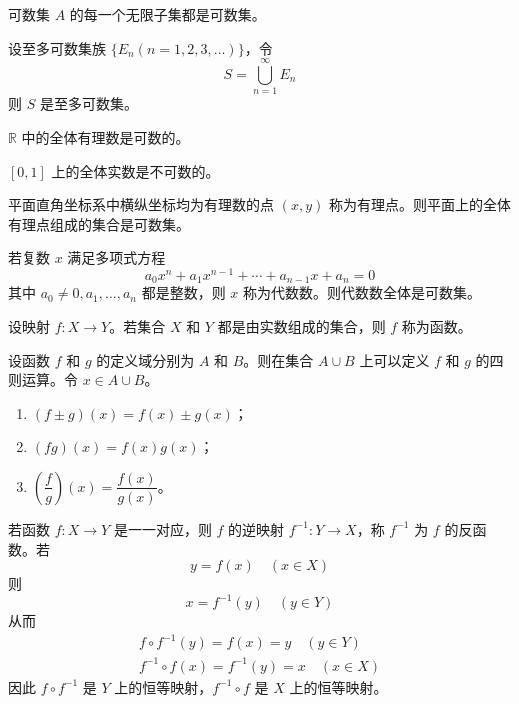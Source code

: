 \begin{theorem}
    可数集 $A$ 的每一个无限子集都是可数集。
\end{theorem}

\begin{theorem}
    设至多可数集族 $\{ E_n (n = 1,2,3, \ldots) \}$，令
    \[S = \bigcup_{n = 1}^{\infty} E_n \]
    则 $S$ 是至多可数集。
\end{theorem}

\begin{theorem}
    $\mathbb{R}$ 中的全体有理数是可数的。
\end{theorem}

\begin{theorem}
    $[0, 1]$ 上的全体实数是不可数的。
\end{theorem}

\begin{proposition}
    平面直角坐标系中横纵坐标均为有理数的点 $(x, y)$ 称为有理点。则平面上的全体有理点组成的集合是可数集。
\end{proposition}

\begin{proposition}
    若复数 $x$ 满足多项式方程
    \[a_{0}x^{n} + a_{1}x^{n - 1} + \cdots + a_{n - 1}x + a_{n} = 0\]
    其中 $a_0 \neq 0, a_1, \ldots , a_n$ 都是整数，则 $x$ 称为代数数。则代数数全体是可数集。
\end{proposition}

\begin{definition}
    设映射 $f: X \to Y$。若集合 $X$ 和 $Y$ 都是由实数组成的集合，则 $f$ 称为函数。
\end{definition}

\begin{definition}
    设函数 $f$ 和 $g$ 的定义域分别为 $A$ 和 $B$。则在集合 $A \cup B$ 上可以定义 $f$ 和 $g$ 的四则运算。令 $x \in A \cup B$。
    \begin{enumerate}[itemsep=0.5em]
        \item $(f \pm g)(x) = f(x) \pm g(x)$；
        \item $(fg)(x) = f(x)g(x)$；
        \item $\left( \dfrac{f}{g} \right)(x) = \dfrac{f(x)}{g(x)}$。
    \end{enumerate}
\end{definition}

\begin{definition}
    若函数 $f: X \to Y$ 是一一对应，则 $f$ 的逆映射 $f^{-1}: Y \to X$，称 $f^{-1}$ 为 $f$ 的反函数。若
    \[y = f(x)\quad (x \in X)\]
    则
    \[x = f^{-1}(y)\quad (y \in Y)\]
    从而
    \begin{gather*}
        f \circ f^{-1}(y) = f(x) = y\quad (y \in Y) \\
        f^{-1} \circ f(x) = f^{-1}(y) = x\quad (x \in X)
    \end{gather*}
    因此 $f \circ f^{-1}$ 是 $Y$ 上的恒等映射，$f^{-1} \circ f$ 是 $X$ 上的恒等映射。
\end{definition}

